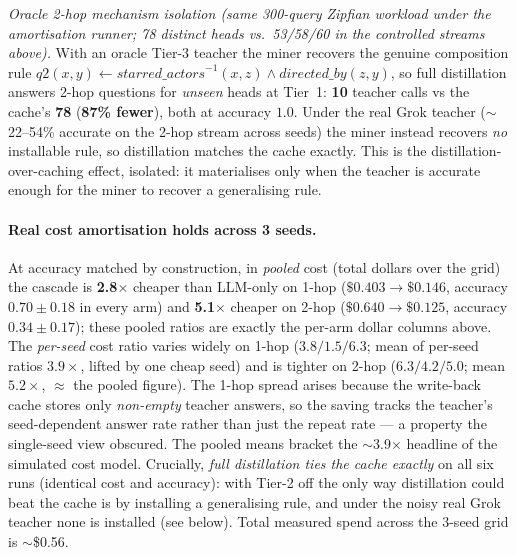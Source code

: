 \documentclass[11pt]{article}
\theoremstyle{plain}
\newcommand{\costFactor}{3.9}
\renewcommand{\costFactor}{3.9}
\begin{document}
\begin{table}[t]
\vspace{0.4em}
\noindent\emph{Oracle 2-hop mechanism isolation (same 300-query Zipfian
workload under the amortisation runner; 78 distinct heads vs.\ 53/58/60 in
the controlled streams above).} With an oracle Tier-3 teacher the miner recovers the genuine
composition rule
$q2(x,y)\!\leftarrow\!\mathit{starred\_actors}^{-1}(x,z)\wedge\mathit{directed\_by}(z,y)$,
so full distillation answers 2-hop questions for \emph{unseen} heads at
Tier~1: \textbf{10} teacher calls vs the cache's \textbf{78}
(\textbf{87\% fewer}), both at accuracy $1.0$. Under the real Grok teacher
($\sim$22--54\% accurate on the 2-hop stream across seeds) the miner instead
recovers \emph{no} installable rule, so distillation matches the cache exactly.
This is the distillation-over-caching effect, isolated: it materialises only
when the teacher is accurate enough for the miner to recover a generalising rule.
\end{table}


\paragraph{Real cost amortisation holds across 3 seeds.} At accuracy matched by
construction, in \emph{pooled} cost (total dollars over the grid) the cascade is
\textbf{2.8$\times$} cheaper than LLM-only on
1-hop ($\$0.403\!\to\!\$0.146$, accuracy $0.70\pm0.18$ in every arm) and
\textbf{5.1$\times$} cheaper on 2-hop ($\$0.640\!\to\!\$0.125$, accuracy
$0.34\pm0.17$); these pooled ratios are exactly the per-arm dollar columns above.
The \emph{per-seed} cost ratio varies widely on 1-hop ($3.8/1.5/6.3$; mean of
per-seed ratios $3.9\times$, lifted by one cheap seed) and is tighter on 2-hop
($6.3/4.2/5.0$; mean $5.2\times$, $\approx$ the pooled figure). The 1-hop spread
arises because the write-back cache stores only \emph{non-empty} teacher answers,
so the saving tracks the teacher's seed-dependent answer rate rather than just
the repeat rate --- a property the single-seed view obscured. The pooled means
bracket the $\sim$\costFactor$\times$ headline of the simulated cost model.
Crucially, \emph{full distillation ties
the cache exactly} on all six runs (identical cost and accuracy): with Tier-2
off the only way distillation could beat the cache is by installing a
generalising rule, and under the noisy real Grok teacher none is installed (see
below). Total measured spend across the 3-seed grid is $\sim$\$0.56.
\end{document}
